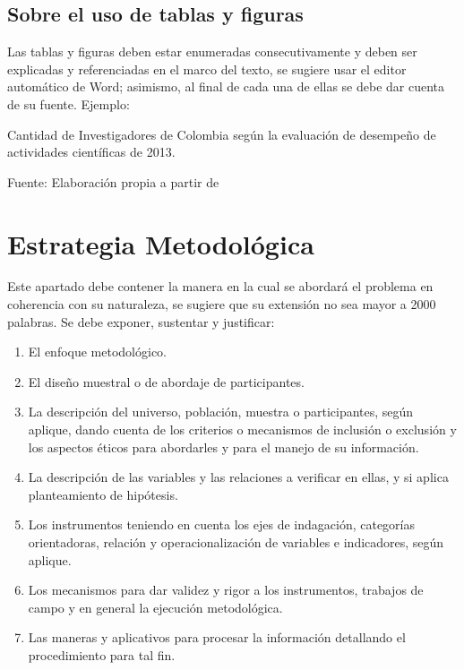 \documentclass[spanish, letterpaper, 12pt]{book}
\begin{document}
\section{Sobre el uso de tablas y figuras}
Las tablas y figuras deben estar enumeradas consecutivamente y deben ser explicadas y referenciadas en el marco del texto, se sugiere usar el editor automático de Word; asimismo, al final de cada una de ellas se debe dar cuenta de su fuente. Ejemplo:

\begin{table}[h]
	\caption{Cantidad de Investigadores de Colombia según la evaluación de desempeño de actividades científicas de 2013.}
	\label{tab:caption}
	\begin{center}
	\end{center}
	Fuente: Elaboración propia a partir de 
\end{table}


\chapter{Estrategia Metodológica}
Este apartado debe contener la manera en la cual se abordará el problema en coherencia con su naturaleza, se sugiere que su extensión no sea mayor a 2000 palabras. Se debe exponer, sustentar y justificar:

\begin{enumerate}
	\item El enfoque metodológico.
	\item El diseño muestral o de abordaje de participantes.
	\item La descripción del universo, población, muestra o participantes, según aplique, dando cuenta de los criterios o mecanismos de inclusión o exclusión y los aspectos éticos para abordarles y para el manejo de su información.
	\item La descripción de las variables y las relaciones a verificar en ellas, y si aplica planteamiento de hipótesis.
	\item Los instrumentos teniendo en cuenta los ejes de indagación, categorías orientadoras, relación y operacionalización de variables e indicadores, según aplique.
	\item Los mecanismos para dar validez y rigor a los instrumentos, trabajos de campo y en general la ejecución metodológica.
	\item Las maneras y aplicativos para procesar la información detallando el procedimiento para tal fin.
\end{enumerate}
\end{document}
